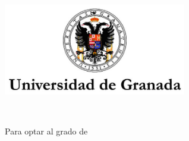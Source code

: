 \begin{titlepage}
    \begin{center}
        \large
        \vspace*{4cm}
        \includegraphics[width=8cm]{gfx/ugr_formal} \\

        \vspace{3cm}

        {\color{ugrOrange}\spacedallcaps{\myTitle}} \\ \bigskip

        \spacedlowsmallcaps{\myName}

        \vspace{2cm}
    {\textcolor{ugrGray}
        {\small Para optar al grado de}\normalsize\\
        \spacedlowsmallcaps{\myDegree} \\ %


        \vfill

        \myTime
    }
        \vfill

    \end{center}
\end{titlepage}   